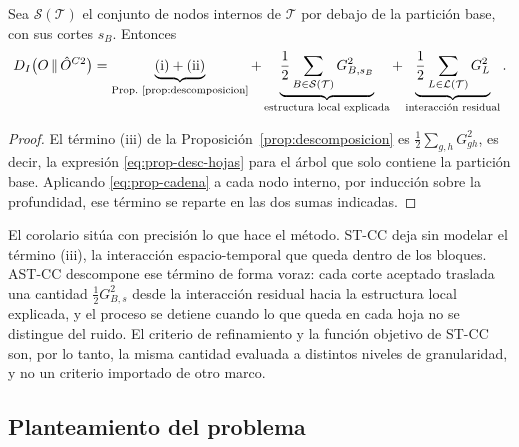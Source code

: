 \begin{corolario}\label{cor:stcc}
Sea $\mathcal{S}(\mathcal{T})$ el conjunto de nodos internos de $\mathcal{T}$
por debajo de la partición base, con sus cortes $s_B$. Entonces
\begin{equation}\label{eq:prop-desc-total}
  D_I\bigl(O\,\|\,\hat O^{C2}\bigr)
  = \underbrace{\text{(i)} + \text{(ii)}}_{\text{Prop.~\ref{prop:descomposicion}}}
  + \underbrace{\frac12\sum_{B\in\mathcal{S}(\mathcal{T})} G^2_{B,s_B}}_{\text{estructura local explicada}}
  + \underbrace{\frac12\sum_{L\in\mathcal{L}(\mathcal{T})} G^2_L}_{\text{interacción residual}} .
\end{equation}
\end{corolario}

\begin{proof}
El término (iii) de la Proposición~\ref{prop:descomposicion} es
$\tfrac12\sum_{g,h}G^2_{gh}$, es decir, la expresión
\eqref{eq:prop-desc-hojas} para el árbol que solo contiene la partición base.
Aplicando \eqref{eq:prop-cadena} a cada nodo interno, por inducción sobre la
profundidad, ese término se reparte en las dos sumas indicadas.
\end{proof}

El corolario sitúa con precisión lo que hace el método. ST-CC deja sin modelar
el término (iii), la interacción espacio-temporal que queda dentro de los
bloques. AST-CC descompone ese término de forma voraz: cada corte aceptado
traslada una cantidad $\tfrac12 G^2_{B,s}$ desde la interacción residual hacia
la estructura local explicada, y el proceso se detiene cuando lo que queda en
cada hoja no se distingue del ruido. El criterio de refinamiento y la función
objetivo de ST-CC son, por lo tanto, la misma cantidad evaluada a distintos
niveles de granularidad, y no un criterio importado de otro marco.

\subsection{Planteamiento del problema}\label{sec:prop-problema}

